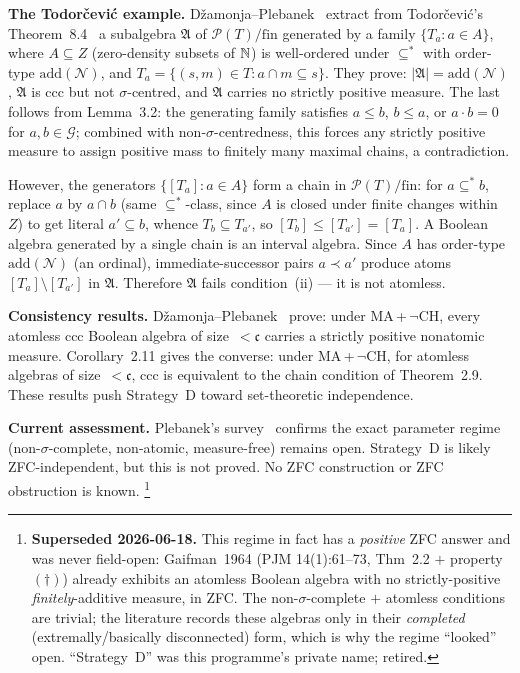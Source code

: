 \medskip\noindent
\textbf{The Todor\v{c}evi\'{c} example.}
D\v{z}amonja--Plebanek~\cite[Theorem~3.1]{DzamonjaPleb2008} extract
from Todor\v{c}evi\'{c}'s Theorem~8.4~\cite{Todorcevic2000} a
subalgebra $\mathfrak{A}$ of $\mathcal{P}(T)/\mathrm{fin}$
generated by a family $\{T_a : a \in A\}$, where $A \subseteq Z$
(zero-density subsets of $\mathbb{N}$) is well-ordered under $\subseteq^*$
with order-type $\mathrm{add}(\mathcal{N})$, and
$T_a = \{(s,m) \in T : a \cap m \subseteq s\}$.  They prove:
$|\mathfrak{A}| = \mathrm{add}(\mathcal{N})$, $\mathfrak{A}$ is ccc
but not $\sigma$-centred, and $\mathfrak{A}$ carries no strictly
positive measure.  The last follows from Lemma~3.2: the generating
family satisfies $a \leq b$, $b \leq a$, or $a \cdot b = 0$ for
$a, b \in \mathcal{G}$; combined with non-$\sigma$-centredness, this
forces any strictly positive measure to assign positive mass to
finitely many maximal chains, a contradiction.

However, the generators $\{[T_a] : a \in A\}$ form a chain in
$\mathcal{P}(T)/\mathrm{fin}$: for $a \subseteq^* b$, replace $a$
by $a \cap b$ (same $\subseteq^*$-class, since $A$ is closed under
finite changes within $Z$) to get literal $a' \subseteq b$, whence
$T_b \subseteq T_{a'}$, so $[T_b] \leq [T_{a'}] = [T_a]$.  A
Boolean algebra generated by a single chain is an interval algebra.
Since $A$ has order-type $\mathrm{add}(\mathcal{N})$ (an ordinal),
immediate-successor pairs $a \prec a'$ produce atoms
$[T_a] \setminus [T_{a'}]$ in $\mathfrak{A}$.  Therefore
$\mathfrak{A}$ fails condition~(ii) --- it is not atomless.

\medskip\noindent
\textbf{Consistency results.}
D\v{z}amonja--Plebanek~\cite[Corollary~2.8]{DzamonjaPleb2008}
prove: under MA\,+\,$\neg$CH, every atomless ccc Boolean algebra of
size~$< \mathfrak{c}$ carries a strictly positive nonatomic measure.
Corollary~2.11 gives the converse: under MA\,+\,$\neg$CH, for
atomless algebras of size~$< \mathfrak{c}$, ccc is equivalent to
the chain condition of Theorem~2.9.  These results push Strategy~D
toward set-theoretic independence.

\medskip\noindent
\textbf{Current assessment.}
Plebanek's survey~\cite{Plebanek2024} confirms the exact parameter
regime (non-$\sigma$-complete, non-atomic, measure-free) remains
open.  Strategy~D is likely ZFC-independent, but this is not proved.
No ZFC construction or ZFC obstruction is known.%
\footnote{\textbf{Superseded 2026-06-18.} This regime in fact has a \emph{positive}
ZFC answer and was never field-open: Gaifman~1964 (PJM 14(1):61--73, Thm~2.2 $+$
property~$(\dagger)$) already exhibits an atomless Boolean algebra with no
strictly-positive \emph{finitely}-additive measure, in ZFC. The non-$\sigma$-complete
$+$ atomless conditions are trivial; the literature records these algebras only in
their \emph{completed} (extremally/basically disconnected) form, which is why the
regime ``looked'' open. ``Strategy~D'' was this programme's private name; retired.}

